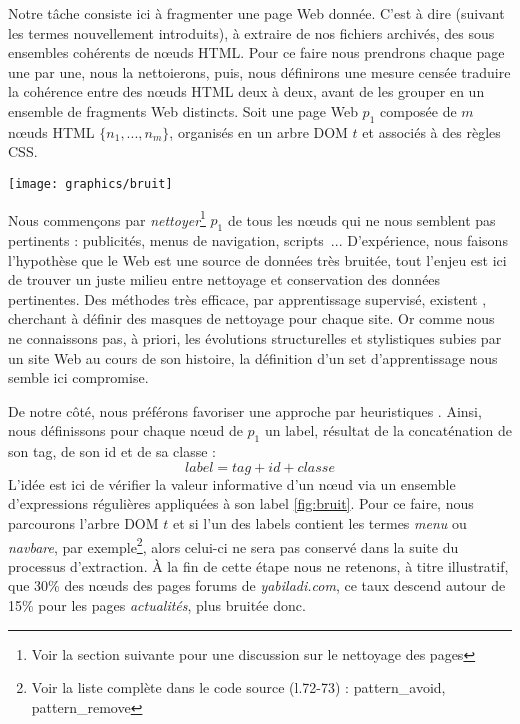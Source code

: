 \documentclass[symmetric,justified,marginals=raggedouter]{tufte-book}
\begin{document}
\noindent Notre tâche consiste ici à fragmenter une page Web donnée. C'est à dire (suivant les termes nouvellement introduits), à extraire de nos fichiers archivés, des sous ensembles cohérents de nœuds HTML. Pour ce faire nous prendrons chaque page une par une, nous la nettoierons, puis, nous définirons une mesure censée traduire la cohérence entre des nœuds HTML deux à deux, avant de les grouper en un ensemble de fragments Web distincts. Soit une page Web $p_1$ composée de $m$ nœuds HTML $\{n_1,...,n_m\}$, organisés en un arbre DOM $t$ et associés à des règles CSS.

\begin{figure*}%
  \texttt{[image: graphics/bruit]}
  \caption{Processus de nettoyage, nœud par nœud, d'une page Web}
  \label{fig:bruit}
\end{figure*}

\noindent Nous commençons par \textit{nettoyer}\footnote{Voir la section suivante pour une discussion sur le nettoyage des pages} $p_1$ de tous les nœuds qui ne nous semblent pas pertinents : publicités, menus de navigation, scripts~... D'expérience, nous faisons l'hypothèse que le Web est une source de données très bruitée, tout l'enjeu est ici de trouver un juste milieu entre nettoyage et conservation des données pertinentes. Des méthodes très efficace, par apprentissage supervisé, existent \citep{kohlschutter_boilerplate_2010}, cherchant à définir des masques de nettoyage pour chaque site.  Or comme nous ne connaissons pas, à priori, les évolutions structurelles et stylistiques subies par un site Web au cours de son histoire, la définition d'un set d'apprentissage nous semble ici compromise. 

De notre côté, nous préférons favoriser une approche par heuristiques \citep{jatowt_detecting_2007}. Ainsi, nous définissons pour chaque nœud de $p_1$ un label, résultat de la concaténation de son tag, de son id et de sa classe : 
\[
label = tag + id + classe
\]
\noindent L'idée est ici de vérifier la valeur informative d'un nœud via un ensemble d'expressions régulières appliquées à son label \ref{fig:bruit}. Pour ce faire, nous parcourons l'arbre DOM $t$ et si l'un des labels contient les termes \textit{menu} ou \textit{navbare}, par exemple\footnote{Voir la liste complète dans le code source (l.72-73) : pattern\_avoid, pattern\_remove}, alors celui-ci ne sera pas conservé dans la suite du processus d'extraction. À la fin de cette étape nous ne retenons, à titre illustratif, que 30\% des nœuds des pages forums de \textit{yabiladi.com}, ce taux descend autour de 15\% pour les pages \textit{actualités}, plus bruitée donc. 
\end{document}
